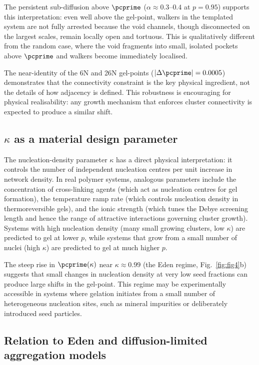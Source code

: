 The persistent sub-diffusion above $\pcprime$ ($\alpha \approx 0.3$--$0.4$ at $p = 0.95$) supports this interpretation: even well above the gel-point, walkers in the templated system are not fully arrested because the void channels, though disconnected on the largest scales, remain locally open and tortuous. This is qualitatively different from the random case, where the void fragments into small, isolated pockets above $\pcprime$ and walkers become immediately localised.

The near-identity of the 6N and 26N gel-points ($|\Delta\pcprime| = 0.0005$) demonstrates that the connectivity constraint is the key physical ingredient, not the details of how adjacency is defined. This robustness is encouraging for physical realisability: any growth mechanism that enforces cluster connectivity is expected to produce a similar shift.

\subsection{$\kappa$ as a material design parameter}

The nucleation-density parameter $\kappa$ has a direct physical interpretation: it controls the number of independent nucleation centres per unit increase in network density. In real polymer systems, analogous parameters include the concentration of cross-linking agents (which act as nucleation centres for gel formation), the temperature ramp rate (which controls nucleation density in thermoreversible gels), and the ionic strength (which tunes the Debye screening length and hence the range of attractive interactions governing cluster growth). Systems with high nucleation density (many small growing clusters, low $\kappa$) are predicted to gel at lower $p$, while systems that grow from a small number of nuclei (high $\kappa$) are predicted to gel at much higher $p$.

The steep rise in $\pcprime(\kappa)$ near $\kappa \approx 0.99$ (the Eden regime, Fig.~\ref{fig:fig4}b) suggests that small changes in nucleation density at very low seed fractions can produce large shifts in the gel-point. This regime may be experimentally accessible in systems where gelation initiates from a small number of heterogeneous nucleation sites, such as mineral impurities or deliberately introduced seed particles.

\subsection{Relation to Eden and diffusion-limited aggregation models}

